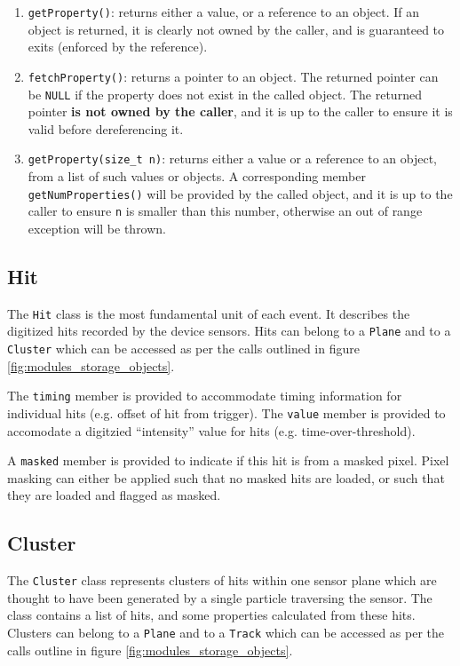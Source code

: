 \documentclass[10pt,a4paper]{book}
\begin{document}
\begin{enumerate}
	\item \Verb`getProperty()`: returns either a value, or a reference to an object. If an object is returned, it is clearly not owned by the caller, and is guaranteed to exits (enforced by the reference).
	\item \Verb`fetchProperty()`: returns a pointer to an object. The returned pointer can be \Verb`NULL` if the property does not exist in the called object. The returned pointer \textbf{is not owned by the caller}, and it is up to the caller to ensure it is valid before dereferencing it.
	\item \Verb`getProperty(size_t n)`: returns either a value or a reference to an object, from a list of such values or objects. A corresponding member \Verb`getNumProperties()` will be provided by the called object, and it is up to the caller to ensure \Verb`n` is smaller than this number, otherwise an out of range exception will be thrown.
\end{enumerate}

\subsection{Hit}

The \Verb`Hit` class is the most fundamental unit of each event. It describes the digitized hits recorded by the device sensors. Hits can belong to a \Verb`Plane` and to a \Verb`Cluster` which can be accessed as per the calls outlined in figure \ref{fig:modules_storage_objects}.

The \Verb`timing` member is provided to accommodate timing information for individual hits (e.g. offset of hit from trigger). The \Verb`value` member is provided to accomodate a digitzied ``intensity'' value for hits (e.g. time-over-threshold).

A \Verb`masked` member is provided to indicate if this hit is from a masked pixel. Pixel masking can either be applied such that no masked hits are loaded, or such that they are loaded and flagged as masked.

\subsection{Cluster}

The \Verb`Cluster` class represents clusters of hits within one sensor plane which are thought to have been generated by a single particle traversing the sensor. The class contains a list of hits, and some properties calculated from these hits. Clusters can belong to a \verb`Plane` and to a \verb`Track` which can be accessed as per the calls outline in figure \ref{fig:modules_storage_objects}.
\end{document}
